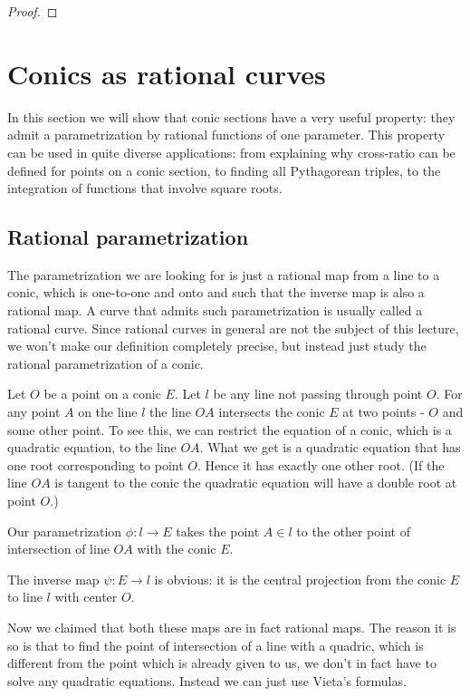 {{\begin{proof}
\end{proof}

\section{Conics as rational curves}

In this section we will show that conic sections have a very useful property: they admit a parametrization by rational functions of one parameter. This property can be used in quite diverse applications: from explaining why cross-ratio can be defined for points on a conic section, to finding all Pythagorean triples, to the integration of functions that involve square roots.

\subsection{Rational parametrization}

The parametrization we are looking for is just a rational map from a line to a conic, which is one-to-one and onto and such that the inverse map is also a rational map. A curve that admits such parametrization is usually called a rational curve. Since rational curves in general are not the subject of this lecture, we won't make our definition completely precise, but instead just study the rational parametrization of a conic.

Let $O$ be a point on a conic $E$. Let $l$ be any line not passing through point $O$. For any point $A$ on the line $l$ the line $OA$ intersects the conic $E$ at two points - $O$ and some other point. To see this, we can restrict the equation of a conic, which is a quadratic equation, to the line $OA$. What we get is a quadratic equation that has one root corresponding to point $O$. Hence it has exactly one other root. (If the line $OA$ is tangent to the conic the quadratic equation will have a double root at point $O$.)

Our parametrization $\phi:l\rightarrow E$ takes the point $A\in l$ to the other point of intersection of line $OA$ with the conic $E$.

The inverse map $\psi:E\rightarrow l$ is obvious: it is the central projection from the conic $E$ to line $l$ with center $O$.

Now we claimed that both these maps are in fact rational maps. The reason it is so is that to find the point of intersection of a line with a quadric, which is different from the point which is already given to us, we don't in fact have to solve any quadratic equations. Instead we can just use Vieta's formulas.

}}
